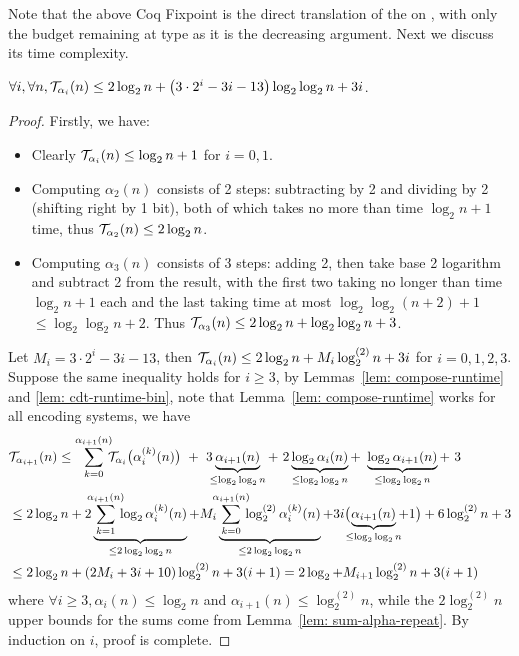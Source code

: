 Note that the above Coq Fixpoint is the direct translation of the  on , with only the budget remaining at type  as it is the decreasing argument. Next we discuss its time complexity.
\begin{thm}
	$\forall i, \forall n, \mathcal{T}_{\alpha_i}(n) \le 2\log_2n + \left(3\cdot 2^i - 3i - 13\right)\log_2\log_2n + 3i$.
\end{thm}
\begin{proof}
	Firstly, we have:
	\begin{itemize}
		\item Clearly $\mathcal{T}_{\alpha_i}(n)\le \log_2n + 1$ for $i = 0, 1$.
		\item Computing $\alpha_2(n)$ consists of 2 steps: subtracting by 2 and dividing by 2 (shifting right by 1 bit), both of which takes no more than time $\log_2n + 1$ time, thus $\mathcal{T}_{\alpha_2}(n)\le 2\log_2n$.
		\item Computing $\alpha_3(n)$ consists of 3 steps: adding 2, then take base 2 logarithm and subtract 2 from the result, with the first two taking no longer than time $\log_2n + 1$ each and the last taking time at most $\log_2\log_2(n+2) + 1$ $\le \log_2\log_2 n + 2$. Thus $\mathcal{T}_{\alpha_3}(n)\le 2\log_2n + \log_2\log_2n + 3$.
	\end{itemize}
  Let $M_i = 3\cdot 2^i - 3i - 13$, then $\mathcal{T}_{\alpha_i}(n)\le 2\log_2n + M_i\log_2^{(2)}n + 3i$ for $i = 0, 1, 2, 3$.
	Suppose the same inequality holds for $i\ge 3$, by Lemmas~\ref{lem: compose-runtime} and \ref{lem: cdt-runtime-bin}, note that Lemma~\ref{lem: compose-runtime} works for all encoding systems, we have
	\begin{equation*}
	\begin{aligned}
	& \runtime_{\alpha_{i+1}}(n) \le
	\sum_{k=0}^{\alpha_{i+1}(n)} \hspace{-5pt} \runtime_{\alpha_i}\big(\alpha_i^{(k)}(n)\big)
	\ + \ 3\hspace{-4pt}\underbrace{\alpha_{i+1}(n)}_{\le \log_2\log_2n}
	+ \ 2\underbrace{\log_2\alpha_i(n)}_{\le \log_2\log_2n}
	+ \ \underbrace{\log_2\alpha_{i+1}(n)}_{\le \log_2\log_2n} + \ 3 \\
	& \le 2\log_2n
	+ 2\underbrace{\hspace{-5pt}\sum_{k=1}^{\alpha_{i+1}(n)}\hspace{-5pt} \log_2\alpha_i^{(k)}(n)}_{\le 2\log_2\log_2n}
	+ M_i\underbrace{\hspace{-5pt}\sum_{k=0}^{\alpha_{i+1}(n)}\hspace{-5pt} \log_2^{(2)}\alpha_i^{(k)}(n)}_{\le 2\log_2\log_2n}
	+ 3i\big(\hspace{-5.5pt}\underbrace{\alpha_{i+1}(n)}_{\le \log_2\log_2n}\hspace{-4pt} + 1\big) + 6\log_2^{(2)}n + 3 \\
	& \le 2\log_2n + (2M_i + 3i + 10)\log_2^{(2)}n + 3(i + 1)
	= 2\log_2 + M_{i+1}\log_2^{(2)}n + 3(i + 1)
	\end{aligned}
	\end{equation*}
	where $\forall i\ge 3, \alpha_i(n)\le \log_2n$ and $\alpha_{i+1}(n)\le \log_2^{(2)}n$, while the $2\log_2^{(2)}n$ upper bounds for the sums come from Lemma~\ref{lem: sum-alpha-repeat}.
	By induction on $i$, proof is complete.
\end{proof}
